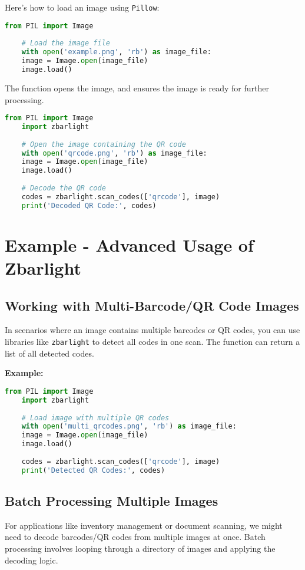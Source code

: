 Here’s how to load an image using \texttt{Pillow}:
\begin{lstlisting}[language=Python]
	from PIL import Image
	
	# Load the image file
	with open('example.png', 'rb') as image_file:
	image = Image.open(image_file)
	image.load()
\end{lstlisting}

The  function opens the image, and  ensures the image is ready for further processing.

\begin{lstlisting}[language=Python]
	from PIL import Image
	import zbarlight
	
	# Open the image containing the QR code
	with open('qrcode.png', 'rb') as image_file:
	image = Image.open(image_file)
	image.load()
	
	# Decode the QR code
	codes = zbarlight.scan_codes(['qrcode'], image)
	print('Decoded QR Code:', codes)
\end{lstlisting}


\section{Example - Advanced Usage of Zbarlight}

\subsection{Working with Multi-Barcode/QR Code Images}
In scenarios where an image contains multiple barcodes or QR codes, you can use libraries like \texttt{zbarlight} to detect all codes in one scan. The  function can return a list of all detected codes.\cite{zbarlightgithub:2024}

\textbf{Example:}
\begin{lstlisting}[language=Python]
	from PIL import Image
	import zbarlight
	
	# Load image with multiple QR codes
	with open('multi_qrcodes.png', 'rb') as image_file:
	image = Image.open(image_file)
	image.load()
	
	codes = zbarlight.scan_codes(['qrcode'], image)
	print('Detected QR Codes:', codes)
\end{lstlisting}

\subsection{Batch Processing Multiple Images}
For applications like inventory management or document scanning, we might need to decode barcodes/QR codes from multiple images at once. Batch processing involves looping through a directory of images and applying the decoding logic.\cite{zbarlightgithub:2024}

